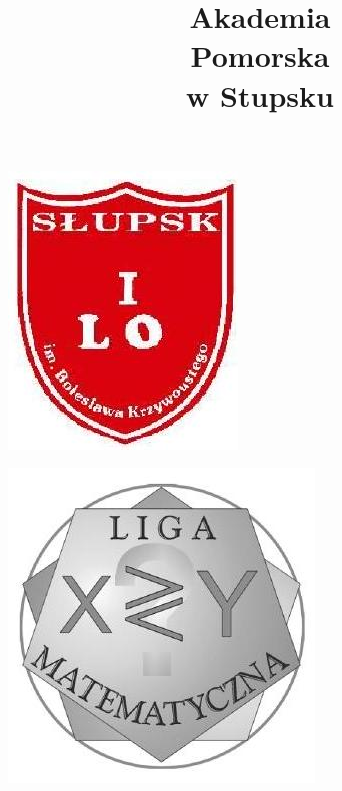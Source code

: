\documentclass[10pt]{article}
\title{Akademia \\
 Pomorska \\
 w Stupsku }
\author{}
\date{}
\begin{document}
\maketitle
\begin{center}
\includegraphics[max width=\textwidth]{2024_11_21_3ef8bd11d8ae747125ecg-1(1)}
\end{center}

\begin{center}
\includegraphics[max width=\textwidth]{2024_11_21_3ef8bd11d8ae747125ecg-1(2)}
\end{center}
\end{document}

